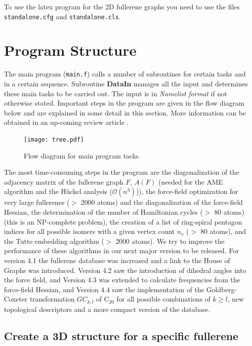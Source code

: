 \documentclass[article,a4paper,twoside]{memoir}
\newcommand{\C}[1]{\ensuremath{\mathrm{C}_{#1}}}
\newcommand{\filename}[1]{\texttt{#1}}
\newcommand{\funname}[1]{{\color{blue}\textbf{#1}}}
\begin{document}
To use the latex program for the 2D fullerene graphs you need to use the files \filename{standalone.cfg} and \filename{standalone.cls}.


\section{Program Structure}
The main program (\filename{main.f}) calls a number of subroutines for certain tasks and in a certain sequence.
Subroutine \funname{DataIn} manages all the input and determines these main tasks to be carried out.
The input is in \textit{Namelist format} if not otherwise stated. 
Important steps in the program are given in the flow diagram below and are
explained in some detail in this section. More information can be obtained in an up-coming review article \cite{PSJA}.

\begin{figure}[htbp]
   	\centering
	\texttt{[image: tree.pdf]} 
    \caption{Flow diagram for main program tasks.}
    \label{pic:flowdiagram}
\end{figure}

The most time-consuming steps in the program are the diagonalization of the adjacency matrix 
of the fullerene graph $F$, $A(F)$  
(needed for the AME algorithm and the H\"uckel analysis ($\mathcal{O}(n^3)$)), the force-field optimization for
very large fullerenes ($>$ 2000 atoms)  and the diagonalization of
the force-field Hessian, the determination of the number of Hamiltonian cycles
($>$ 80 atoms) (this is an NP-complete problem), the creation of a list of ring-spiral pentagon
indices for all possible isomers with a given vertex count $n_v$ ($>$ 80 atoms), 
and the Tutte embedding algorithm ($>$ 2000 atoms). We try to improve the performance of these algorithms
in our next major version to be released. For version 4.1 the fullerene database was increased and a link to
the House of Graphs was introduced. Version 4.2 saw the introduction of dihedral angles into the force field,
and Version 4.3 was extended to calculate frequencies from the force-field Hessian, and Version 4.4 saw
the implementation of the Goldberg-Coxeter transformation $GC_{k,l}$ of \C{20} for all possible combinations of $k \geq l$,
new topological descriptors and a more compact version of the database.

\subsection{Create a 3D structure for a specific fullerene}
\end{document}

